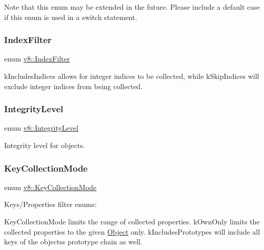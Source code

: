 Note that this enum may be extended in the future. Please include a default case if this enum is used in a switch statement. \mbox{\label{namespacev8_a46fd71fef702b35b34ed7495e7a63323}} 
\subsubsection{\texorpdfstring{Index\+Filter}{IndexFilter}}
{\footnotesize\ttfamily enum \mbox{\hyperlink{namespacev8_a46fd71fef702b35b34ed7495e7a63323}{v8\+::\+Index\+Filter}}\hspace{0.3cm}{\ttfamily [strong]}}

k\+Includes\+Indices allows for integer indices to be collected, while k\+Skip\+Indices will exclude integer indices from being collected. \mbox{\label{namespacev8_a02642d03ff1eecc2fd358626499c2e30}} 
\subsubsection{\texorpdfstring{Integrity\+Level}{IntegrityLevel}}
{\footnotesize\ttfamily enum \mbox{\hyperlink{namespacev8_a02642d03ff1eecc2fd358626499c2e30}{v8\+::\+Integrity\+Level}}\hspace{0.3cm}{\ttfamily [strong]}}

Integrity level for objects. \mbox{\label{namespacev8_a0cee20f5c7f0d59d0835af8e537388dc}} 
\subsubsection{\texorpdfstring{Key\+Collection\+Mode}{KeyCollectionMode}}
{\footnotesize\ttfamily enum \mbox{\hyperlink{namespacev8_a0cee20f5c7f0d59d0835af8e537388dc}{v8\+::\+Key\+Collection\+Mode}}\hspace{0.3cm}{\ttfamily [strong]}}

Keys/\+Properties filter enums\+:

Key\+Collection\+Mode limits the range of collected properties. k\+Own\+Only limits the collected properties to the given \mbox{\hyperlink{classv8_1_1Object}{Object}} only. k\+Includes\+Prototypes will include all keys of the objects\textquotesingle{}s prototype chain as well. \mbox{\label{namespacev8_aa65aeff871614520d8033dead4b34e38}} 
